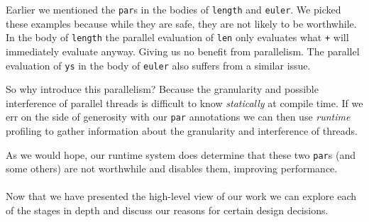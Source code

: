 Earlier we mentioned the \verb-par-s in the bodies of \verb-length- and
\verb-euler-. We picked these examples because while they are safe, they are
not likely to be worthwhile. In the body of \verb-length- the parallel
evaluation of \verb-len- only evaluates what \verb-+- will immediately evaluate
anyway. Giving us no benefit from parallelism. The parallel evaluation of
\verb-ys- in the body of \verb-euler- also suffers from a similar issue.

So why introduce this parallelism? Because the granularity and possible
interference of parallel threads is difficult to know \emph{statically} at
compile time. If we err on the side of generosity with our \verb-par-
annotations we can then use \emph{runtime} profiling to gather information
about the granularity and interference of threads. 

As we would hope, our runtime system does determine that these two \verb-par-s (and some
others) are not worthwhile and disables them, improving performance.

\paragraph{}

Now that we have presented the high-level view of our work we can explore each of
the stages in depth and discuss our reasons for certain design decisions.
